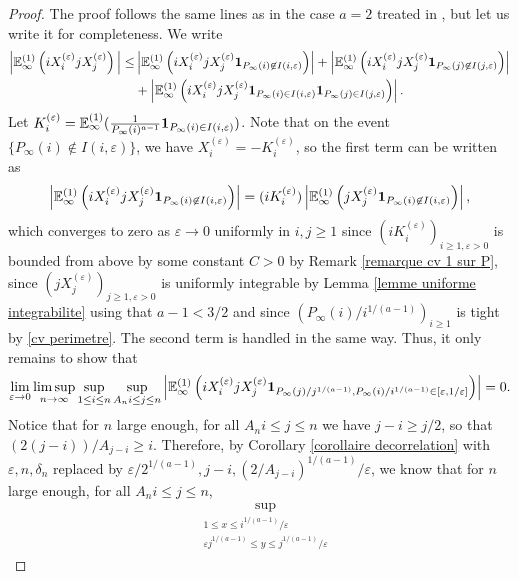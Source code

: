 \documentclass[11pt]{article}
\numberwithin{equation}{section}
\def\vp{\varepsilon}
\def\E{\mathbb{E}}
\begin{document}
\begin{proof}
The proof follows the same lines as in the case $a=2$ treated in \cite{BCM}, but let us write it for completeness. We write
\begin{align*}
\Big\vert
\E^{(1)}_\infty
\left(
i X_i^{(\vp)}
j X_j^{(\vp)}
\right)
\Big\vert 
\le 
&\left\vert
\E^{(1)}_\infty
\left(
i X_i^{(\vp)}
j X_j^{(\vp)}
{\bf 1}_{P_\infty(i)\not\in I(i, \vp)}
\right)
\right\vert 
+\left\vert
\E^{(1)}_\infty
\left(
i X_i^{(\vp)}
j X_j^{(\vp)}
{\bf 1}_{P_\infty(j)\not\in I(j, \vp)}
\right)
\right\vert
\\
&+
\left\vert
\E^{(1)}_\infty
\left(
i X_i^{(\vp)}
j X_j^{(\vp)}
{\bf 1}_{P_\infty(i)\in I(i, \vp)} {\bf 1}_{P_\infty(j) \in I(j, \vp)}
\right)
\right\vert.
\end{align*}
Let $K_i^{(\vp)}= \E^{(1)}_\infty (\frac{1}{P_\infty(i)^{a-1}} {\bf 1}_{P_\infty(i) \in I(i, \vp)})$. Note that on the event $\{P_\infty(i) \not \in I(i, \vp)\}$, we have $X_i^{(\vp)}= -K_i^{(\vp)}$, so the first term can be written {as}
$$
\left\vert
\E^{(1)}_\infty
\left(
i X_i^{(\vp)}
j X_j^{(\vp)}
{\bf 1}_{P_\infty(i)\not\in I(i, \vp)}
\right)
\right\vert
=
(i K_i^{(\vp)})
\left\vert
\E^{(1)}_\infty
\left(
j X_j^{(\vp)}
{\bf 1}_{P_\infty(i)\not\in I(i, \vp)}
\right)
\right\vert,
$$
which converges to zero as $\vp \to 0$ uniformly in $i,j\ge 1$ since $(i K_i^{(\vp)})_{i\ge 1,\vp >0}$ is {bounded from above} by some constant $C>0$ by Remark \ref{remarque cv 1 sur P}, since $(j X_j^{(\vp)})_{j\ge 1,\vp >0}$ is uniformly integrable by Lemma \ref{lemme uniforme integrabilite} using that $a-1<3/2$ and since $(P_\infty(i)/i^{1/(a-1)})_{i\ge 1}$ is tight by \eqref{cv perimetre}. The second term is handled in the same way. Thus, it only remains to show that
\begin{equation}\label{eq lim limsup sup sup X epsilon}
\lim_{\vp \to 0} \limsup_{n\to \infty} \sup_{1 \le i \le n} \sup_{A_n i \le j \le n}
\left\vert
\E^{(1)}_\infty
\left(
i X_i^{(\vp)}
j X_j^{(\vp)}
{\bf 1}_{P_\infty(j)/j^{1/(a-1)},P_\infty(i)/i^{1/(a-1)} \in [\vp,1/\vp]}
\right)
\right\vert
=0.
\end{equation}
Notice that for $n$ large enough, for all $A_n i \le j \le n$ we have $j-i \ge j/2$, so that $(2(j-i))/A_{j-i} \ge i$. Therefore, by Corollary \ref{corollaire decorrelation} with $\vp, n, \delta_n$ replaced by $\vp/2^{1/(a-1)},j-i,(2/A_{j-i})^{1/(a-1)}/\vp$, we know that for $n$ large enough, for all $A_n i \le j \le n$,
\begin{align*}
&\!\!\!\!\sup_{\substack{1\le x \le i^{1/(a-1)}/\vp\\ \vp j^{1/(a-1)} \le y \le j^{1/(a-1)}/\vp}} \!

\end{align*}
\end{proof}
\end{document}
